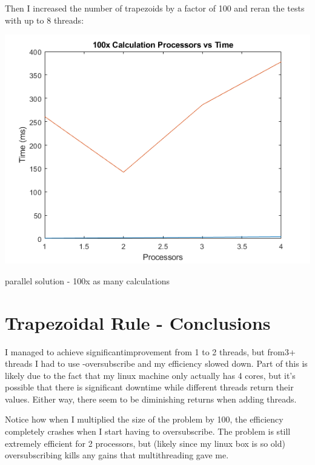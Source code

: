 \documentclass[a4paper]{article}
\begin{document}
Then I increased the number of trapezoids by a factor of 100 and reran the tests with up to 8 threads:

\begin{center}
    \includegraphics[scale=1]{11c.png}
    \caption{parallel solution - 100x as many calculations}
\end{center}

\noindent


\section{Trapezoidal Rule - Conclusions}

I managed to achieve significantimprovement from 1 to 2 threads, but from3+ threads I had to use -oversubscribe and my efficiency slowed down. Part of this is likely due to the fact that my linux machine only actually has 4 cores, but it's possible that there is significant downtime while different threads return their values. Either way, there seem to be diminishing returns when adding threads.

Notice how when I multiplied the size of the problem by 100, the efficiency completely crashes when I start having to oversubscribe. The problem is still extremely efficient for 2 processors, but (likely since my linux box is so old) oversubscribing kills any gains that multithreading gave me.
\end{document}
